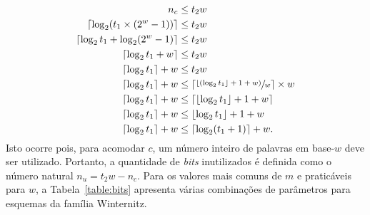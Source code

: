\documentclass{ufsctex/ufsctex}
\begin{document}
\begin{align}
  \begin{split}
    n_{c} &\leq t_{2} w \\
    \lceil \log_2 (t_{1} \times (2^{w} - 1)) \rceil &\leq t_{2}w \\
    \lceil \log_2 t_{1} + \log_2 (2^{w} - 1) \rceil &\leq t_{2}w \\
    \lceil \log_2 t_{1} + w \rceil &\leq t_{2}w \\
    \lceil \log_2 t_{1} \rceil + w &\leq t_{2}w \\
    \lceil \log_2 t_{1} \rceil + w &\leq \left\lceil
      \sfrac{\lfloor (\log_2 t_{1} \rfloor + 1 + w)}{w} \right\rceil \times w \\
    \lceil \log_2 t_{1} \rceil + w
      &\leq \lceil \lfloor \log_2 t_{1} \rfloor + 1 + w \rceil \\
    \lceil \log_2 t_{1} \rceil + w &\leq \lfloor \log_2 t_{1} \rfloor + 1 + w \\
    \lceil \log_2 t_{1} \rceil + w &\leq \lceil \log_2 (t_{1} + 1) \rceil + w.
  \end{split}
\end{align}
Isto ocorre pois, para acomodar $c$, um número inteiro de palavras em base-$w$
deve ser utilizado. Portanto, a quantidade de \emph{bits} inutilizados é
definida como o número natural $n_{u} = t_{2}w - n_{c}$. Para os valores mais
comuns de $m$ e praticáveis para $w$, a Tabela~\ref{table:bits} apresenta
várias combinações de parâmetros para esquemas da família Winternitz.
\end{document}
